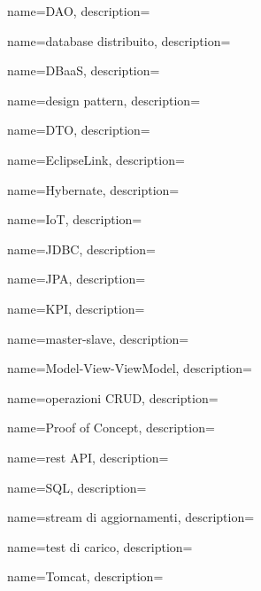 

{
    name=DAO,
    description={}
}

{
    name=database distribuito,
    description={}
}

{
    name=DBaaS,
    description={}
}

{
    name=design pattern,
    description={}
}

{
    name=DTO,
    description={}
}

{
    name=EclipseLink,
    description={}
}


{
    name=Hybernate,
    description={}
}

{
    name=IoT,
    description={}
}

{
    name=JDBC,
    description={}
}

{
    name=JPA,
    description={}
}

{
    name=KPI,
    description={}
}

{
    name=master-slave,
    description={}
}

{
    name=Model-View-ViewModel,
    description={}
}

{
    name=operazioni CRUD,
    description={}
}

{
    name=Proof of Concept,
    description={}
}


{
    name=rest API,
    description={}
}

{
    name=SQL,
    description={}
}

{
    name=stream di aggiornamenti,
    description={}
}

{
    name=test di carico,
    description={}
}

{
    name=Tomcat,
    description={}
}

